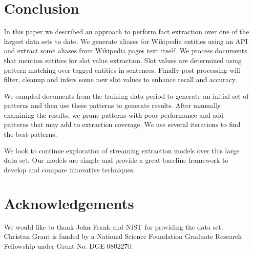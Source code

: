 \documentclass[letterpaper]{article}
\begin{document}
\section{Conclusion}

In this paper we described an approach to perform fact extraction over one of the largest data sets to date. 
We generate aliases for Wikipedia entities using an API and extract some aliases from Wikipedia pages text itself.
We process documents that mention entities for slot value extraction.
Slot values are determined using pattern matching over tagged entities in sentences.
Finally post processing will filter, cleanup and infers some new slot values to enhance recall and accuracy. 

We sampled documents from the training data period to generate an initial set of patterns and then use these patterns to generate results.
After manually examining the results, we prune patterns with poor performance and add patterns that may add to extraction coverage.
We use several iterations to find the best patterns.



We look to continue exploration of streaming extraction models over this large data set.
Our models are simple and provide a great baseline framework to develop and compare innovative techniques.







\section*{Acknowledgements}
We would like to thank John Frank and NIST for providing the data set.
Christan Grant is funded by a National Science Foundation Graduate Research Fellowship under Grant No. DGE-0802270.






  


\end{document}
